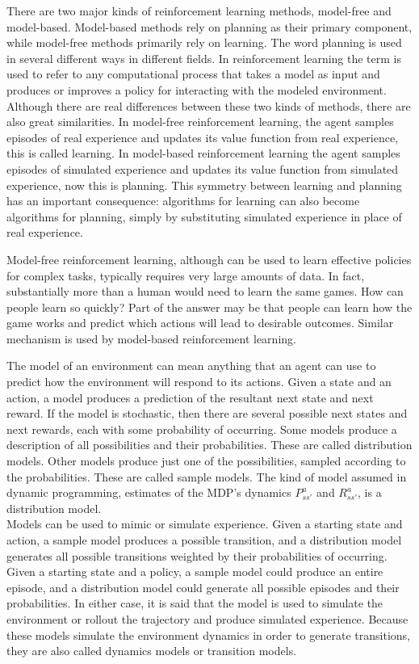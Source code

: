 There are two major kinds of reinforcement learning methods, model-free and model-based. Model-based methods rely on planning as their primary component, while model-free methods primarily rely on learning. The word planning is used in several different ways in different fields. In reinforcement learning the term is used to refer to any computational process that takes a model as input and produces or improves a policy for interacting with the modeled environment. \\
Although there are real differences between these two kinds of methods, there are also great similarities. In model-free reinforcement learning, the agent samples episodes of real experience and updates its value function from real experience, this is called learning. In model-based reinforcement learning the agent samples episodes of simulated experience and updates its value function from simulated experience, now this is planning. This symmetry between learning and planning has an important consequence: algorithms for learning can also become algorithms for planning, simply by substituting simulated experience in place of real experience.

Model-free reinforcement learning, although can be used to learn effective policies for complex tasks, typically requires very large amounts of data. In fact, substantially more than a human would need to learn the same games. How can people learn so quickly? Part of the answer may be that people can learn how the game works and predict which actions will lead to desirable outcomes. Similar mechanism is used by model-based reinforcement learning.

The model of an environment can mean anything that an agent can use to predict how the environment will respond to its actions. Given a state and an action, a model produces a prediction of the resultant next state and next reward. If the model is stochastic, then there are several possible next states and next rewards, each with some probability of occurring. Some models produce a description of all possibilities and their probabilities. These are called distribution models. Other models produce just one of the possibilities, sampled according to the probabilities. These are called sample models. The kind of model assumed in dynamic programming, estimates of the MDP’s dynamics $P^a_{ss'}$ and $R^a_{ss'}$, is a distribution model. \\
Models can be used to mimic or simulate experience. Given a starting state and action, a sample model produces a possible transition, and a distribution model generates all possible transitions weighted by their probabilities of occurring. Given a starting state and a policy, a sample model could produce an entire episode, and a distribution model could generate all possible episodes and their probabilities. In either case, it is said that the model is used to simulate the environment or rollout the trajectory and produce simulated experience. Because these models simulate the environment dynamics in order to generate transitions, they are also called dynamics models or transition models.

